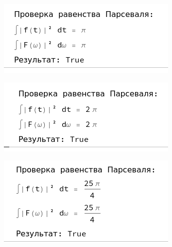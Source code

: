 \documentclass[a4paper,12pt]{article}
\begin{document}
\begin{center}
\begin{minipage}{0.32\textwidth}
  \centering
  \includegraphics[width=\linewidth]{images/3P11.png}
\end{minipage}
\hfill
\begin{minipage}{0.32\textwidth}
  \centering
  \includegraphics[width=\linewidth]{images/3P22.png}
\end{minipage}
\hfill
\begin{minipage}{0.32\textwidth}
  \centering
  \includegraphics[width=\linewidth]{images/3P54.png}
\end{minipage}
\end{center}
\end{document}
